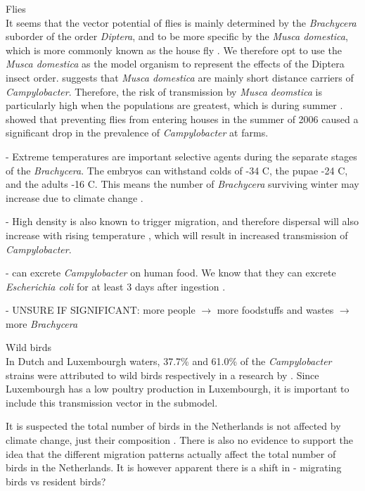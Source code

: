 \textcolor{AMAZINGPINK}{Flies} \\
It seems that the vector potential of flies is mainly determined by the \textit{Brachycera} suborder of the order \textit{Diptera}, and to be more specific by the \textit{Musca domestica}, which is more commonly known as the house fly \parencite{hald_influxed_2008}. We therefore opt to use the \textit{Musca domestica} as the model organism to represent the effects of the Diptera insect order. \cite{skovgard_retention_2011} suggests that \textit{Musca domestica} are mainly short distance carriers of \textit{Campylobacter}. Therefore, the risk of transmission by \textit{Musca deomstica} is particularly high when the populations are greatest, which is during summer \parencite{royden_role_2016}. \cite{hald_use_2007} showed that preventing flies from entering houses in the summer of 2006 caused a significant drop in the prevalence of \textit{Campylobacter} at farms.


- Extreme temperatures are important selective agents during the separate stages of the \textit{Brachycera}. The embryos can withstand colds of -34 \degree C, the pupae -24 \degree C, and the adults -16 \degree C.  This means the number of \textit{Brachycera} surviving winter may increase due to climate change \parencite{goulson_predicting_2005}.

- High density is also known to trigger migration, and therefore dispersal will also increase with rising temperature \parencite{feder_locomotion_2010}, which will result in increased transmission of \textit{Campylobacter}.

-  can excrete \textit{Campylobacter}  on human food. We know that they can excrete \textit{Escherichia coli} for at least 3 days after ingestion \parencite{sasaki_epidemiological_2000}.


- UNSURE IF SIGNIFICANT: more people $\to$ more foodstuffs and wastes \parencite{garcia-garcia_framework_2015} $\to$ more \textit{Brachycera} \parencite{imai_population_1984, rozendaal_houseflies_1997}

\textcolor{AMAZINGPINK}{Wild birds} \\
In Dutch and Luxembourgh waters, 37.7\% and 61.0\% of the \textit{Campylobacter} strains were attributed to wild birds respectively in a research by \cite{mughini-gras_quantifying_2016}. Since Luxembourgh has a low poultry production in Luxembourgh, it is important to include this transmission vector in the submodel.

It is suspected the total number of birds in the Netherlands is not affected by climate change, just their composition \parencite{mclean_reduced_2020}. There is also no evidence to support the idea that the different migration patterns actually affect the total number of birds in the Netherlands. It is however apparent there is a shift in 
- migrating birds vs resident birds?

